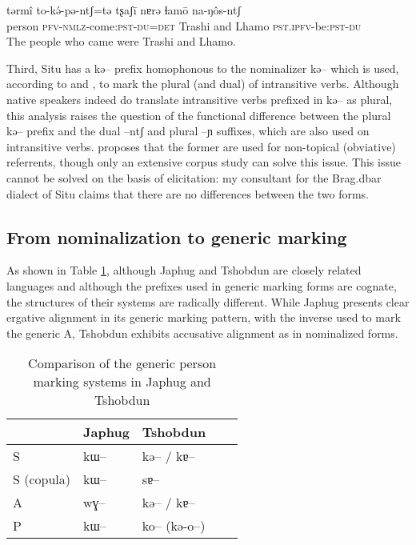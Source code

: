 \documentclass[oldfontcommands,oneside,a4paper,11pt]{article}
\newcommand{\ipa}[1]{{\phon \mbox{#1}}} %
\begin{document}
 \begin{exe}
\ex \label{ex:situ.tokEpEntS}
\gll
\ipa{tərmî}  	\ipa{to-kə́-pə-ntʃ=tə}  	\ipa{tʂaʃī}  	\ipa{nɐrə}  	\ipa{ɬamō}  	\ipa{na-ŋôs-ntʃ}  	\\
person \textsc{pfv-nmlz}-come:\textsc{pst}-\textsc{du=det} Trashi and Lhamo \textsc{pst.ipfv}-be:\textsc{pst}-\textsc{du} \\
\glt The people who came were Trashi and Lhamo.
  \end{exe}

Third, Situ has a   \ipa{kə--} prefix homophonous to the nominalizer \ipa{kə--} which is used, according to \citealt[218]{linxr93jiarong} and \citet[163]{lin09phd}, to mark the plural (and dual) of intransitive verbs. Although native speakers indeed do translate intransitive verbs prefixed in \ipa{kə--} as plural, this analysis raises the question of the functional difference between the plural \ipa{kə--} prefix and the dual \ipa{--ntʃ}  and plural \ipa{--ɲ} suffixes, which are also used on intransitive verbs. \citet[101-102]{jacques12agreement} proposes that the former are used for non-topical (obviative) referrents, though only an extensive corpus study can solve this issue. This issue cannot be solved on the basis of elicitation: my consultant for the Brag.dbar dialect of Situ claims that there are no differences between the two forms. 


\subsection{From nominalization to generic marking} \label{sec:nmlz2genr}
As shown in Table \ref{tab:genr:jpg:tshobdun}, although Japhug and Tshobdun are closely related languages and although the prefixes used in generic marking forms are cognate, the structures of their systems are radically different. While Japhug presents clear ergative alignment in its generic marking pattern, with the inverse used to mark the generic A, Tshobdun exhibits accusative alignment as in nominalized forms.


\begin{table}
\caption{Comparison of the generic person marking systems in Japhug and Tshobdun} \label{tab:genr:jpg:tshobdun} \centering
\begin{tabular}{lllll}
\toprule
& Japhug & Tshobdun \\
\midrule
S & \ipa{kɯ--}& \ipa{kə--} / \ipa{kɐ--} \\
S (copula) & \ipa{kɯ--} & \ipa{sɐ--} \\
A & \ipa{wɣ--} & \ipa{kə--} / \ipa{kɐ--} \\
P & \ipa{kɯ--} & \ipa{ko--} (\ipa{kə-o--}) \\
\bottomrule
\end{tabular}
\end{table}
\end{document}
